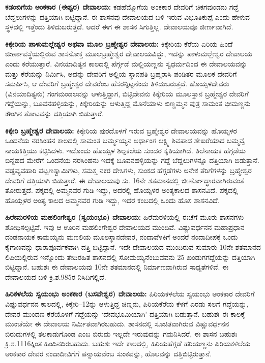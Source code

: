 \textbf{ಕಡಂಬಿಗೆಯ ಅಂಕಕಾರ (ಈಶ್ವರ) ದೇವಾಲಯ:} ಕಡಹೆಮ್ಮೊಗೆಯ ಅಂಕಕಾರ ದೇವರಿಗೆ ಚಿಕಗವುಂಡನು ಗದ್ದೆ ಬೆದ್ದಲುಗಳನ್ನು ದತ್ತಿಯಾಗಿ ಬಿಟ್ಟಿದ್ದಾನೆ. ಈ ಶಾಸನವು ದೇವಾಲಯದ ಬಳಿ ಇರುವ ವಿಭೂತಿಕುಪ್ಪೆ ಎಂದು ಹೇಳುವ ಸ್ಥಳದಲ್ಲಿ ಇತ್ತೆಂದು ತಿಳಿದುಬರುತ್ತದೆ. ಆದರೆ ಈಗ ಈ ಶಾಸನ ಸಿಗುತ್ತಿಲ್ಲ. ದೇವಾಲಯವೂ ಜೀರ್ಣವಾಗಿದೆ.

\textbf{ಕಿಕ್ಕೇರಿಯ ಪಾಳುಮಲ್ಲೇಶ್ವರ ಅಥವಾ ಮೂಲ ಬ್ರಹ್ಮೇಶ್ವರ ದೇವಾಲಯ:} ಕಿಕ್ಕೇರಿಯ ಕೆರೆಯ ಏರಿಯ ಹಿಂದೆ ಜೀರ್ಣಾವಸ್ಥೆಯಲ್ಲಿರುವ ಶಾಸನೋಕ್ತ ಮೂಲಬ್ರಹ್ಮೇಶ್ವರ ದೇವಾಲಯವಿದ್ದು, ಇದನ್ನು ಪಾಳುಮಲ್ಲೇಶ್ವರ ದೇವಾಲಯ ಎಂದು ಕರೆಯುತ್ತಾರೆ. ವಿನಯಾದಿತ್ಯನ ಕಾಲದಲ್ಲಿ ಪೆರ್ಗ್ಗಡೆ ಮಲ್ಲಿಯಣ್ಣನು ಸ್ವಧರ್ಮದಿಂದ ಈ ದೇವಾಲಯವನ್ನು ಮತ್ತು ಕೆರೆಯನ್ನು ನಿರ್ಮಿಸಿ, ಅದನ್ನು ದೇವರಿಗೆ ಅಲ್ಲಿಯ ಸ್ಥಾನಪತಿ ಬ್ರಹ್ಮರಾಸಿ ಪಂಡಿತರ ಮೂಲಕ ದೇವರಿಗೆ ಸಮರ್ಪಿಸಿ, ಆ ದೇವರಿಗೆ ಬ್ರಹ್ಮೇಶ್ವರ ದೇವರೆಂಬ ಹೆಸರನ್ನಿಟ್ಟನೆಂದು ತಿಳಿದುಬರುತ್ತದೆ. ಹೊಯ್ಸಳದೇವರು (ವಿನಯಾದಿತ್ಯನು) ಗಂಗಮಂಡಲವನ್ನು ಆಳುತ್ತಿದ್ದಾಗ, ಬಿಟ್ಟಿದೇವನು ಕಿಕ್ಕೇರಿಯ ಮೂಲಸ್ಥಾನ ಬ್ರಹ್ಮೇಶ್ವರ ದೇವರಿಗೆ ಗದ್ದೆಯನ್ನು, ಬೂವನಹಳ್ಳಿಯನ್ನು, ಕಿಕ್ಕೇರಿಯನ್ನು ಆಳುತ್ತಿದ್ದ ಮೊನೆಯಾಳು ಬಿಣ್ಣಮ್ಮನ ಪುತ್ರ ಸಾಮಂತ ಭೀಮಣ್ಣನು ಕೌಂಗಿನ ತೋಟವನ್ನು ದತ್ತಿಯಾಗಿ ಬಿಡುತ್ತಾರೆ.

\textbf{ಕಿಕ್ಕೇರಿ ಬ್ರಹ್ಮೇಶ್ವರ ದೇವಾಲಯ:} ಕಿಕ್ಕೇರಿಯ ಪುರದೊಳಗೆ ಇರುವ ಬ್ರಹ್ಮೇಶ್ವರ ದೇವಾಲಯವನ್ನು ಹೊಯ್ಸಳರ ಒಂದನೆಯ ನರಸಿಂಹನ ಕಾಲದಲ್ಲಿ ಸಾಮಂತ ಬರ್ಮ್ಮಯ್ಯನ ಅರ್ಧಾಂಗ ಲಕ್ಷ್ಮಿ ಶಿವಪಾದ ಶೇಖರೆಯಾದ ಬಮ್ಮವ್ವೆ ನಾಯಕಿತ್ತಿಯು ಕಟ್ಟಿಸಿದಳು. ಇದೊಂದು ಹೊಯ್ಸಳ ಶಿಲ್ಪಕಲೆಯ ಸುಂದರ ಕೃತಿಯಾಗಿದೆ. ತಿಲೆನಾಯಕ ಹೆಗ್ಗಡೆಯ ಬಿನ್ನಹದ ಮೇರೆಗೆ ಒಂದನೆಯ ನರಸಿಂಹನು ಇದಕ್ಕೆ ಬೂವನಹಳ್ಳಿಯನ್ನು ಗದ್ದೆ ಬೆದ್ದಲುಗಳನ್ನೂ ದತ್ತಿಯಾಗಿ ಬಿಡುತ್ತಾನೆ. ವಡ್ಡವ್ಯವಹಾರಿ ಪಟ್ಟಣಸ್ವಾಮಿಗಳು, ಸಮಸ್ತ ನಕರ ದೇಸಿಗಳು, ಸುಂಕದ ಹೆಗ್ಗಡೆಗಳು ಅನೇಕ ತೆರಿಗೆಗಳನ್ನು ಬ್ರಹ್ಮೇಶ್ವರ ದೇವರಿಗೆ ದತ್ತಿಯಾಗಿ ಬಿಡುತ್ತಾರೆ. ಈ ದೇವಾಲಯವು ಸು. 16ನೇ ಶತಮಾನದಲ್ಲಿ ಜೀರ್ಣೋದ್ಧಾರವಾಗಿರುವಂತೆ ತೋರುತ್ತದೆ. ಪಕ್ಕದಲ್ಲಿ ಅಮ್ಮನವರ ಗುಡಿ ಇದ್ದು, ಅದರಲ್ಲಿ ಹೊಯ್ಸಳರ ಅಂತ್ಯಕಾಲದ ಶಾಸನವಿದೆ. ಪಕ್ಕದಲ್ಲಿ ಹೊಯ್ಸಳರ ಅಂತ್ಯ ಕಾಲದ ಅಮ್ಮನವರ ಗುಡಿ ಇದ್ದು, ಇದರ ಕಂಬದಲ್ಲಿ ಒಂದು ಹೊಸ ಶಾಸನವಿದೆ.

\textbf{ಹಿರೇಮರಳಿಯ ಮಹಲಿಂಗೇಶ್ವರ (ಸ್ವಯಂಭೂ) ದೇವಾಲಯ:} ಹಿರೆಮರಳಿಯಲ್ಲಿ ಈಚೆಗೆ ಮೂರು ಶಾಸನಗಳು ಶೋಧಿಸಲ್ಪಟ್ಟಿವೆ. ಇವು ಆ ಊರಿನ ಮಹಲಿಂಗೇಶ್ವರ ದೇವಾಲಯದ ಮುಂದಿವೆ. ವಿಷ್ಣುವರ್ಧನನ ಮಹಾಪ್ರಧಾನ ದಂಡನಾಯಕ ಕಾಮಯ್ಯನು ಮಣಲಿಯ ಮೂಲಸ್ಥಾನದೇವರ, ನಂದಾವೆಳಕಿಗೆ ಅಂದರೆ ನಂದಾದೀಪಕ್ಕೆ ಒಂದು ಕೈಗಾಣವನ್ನು ಧಾರಾಪೂರ್ವಕವಾಗಿ ದತ್ತಿ ಬಿಟ್ಟಿದ್ದಾನೆ. ಇದೇ ದೇವಾಲಯದ ಮುಂದಿರುವ ಸುಮಾರು 10ನೇ ಶತಮಾನದ ಲಿಪಿಯಲ್ಲಿರುವ ಇನ್ನೊಂದು ತೇದಿರಹಿತ ಶಾಸನದಲ್ಲಿ ಸೋಮಯ್ಯನೆಂಬುವವನು 25 ಖಂಡುಗಗದ್ದೆಯನ್ನು ದತ್ತಿಯಾಗಿ ಬಿಟ್ಟಿದ್ದಾನೆ. ಬಹುಶಃ ಈ ದೇವಾಲಯವು 10ನೇ ಶತಮಾನದಲ್ಲಿ ನಿರ್ಮಾಣವಾಗಿರುವ ಸಾಧ್ಯತೆಗಳಿವೆ. ಈ ದೇವಾಲಯದ ಬಳಿ ಕ್ರಿ.ಶ.985ರ ನಿಸಿದಿಗಲ್ಲಿದೆ.

\textbf{ಹಿರಿಕಳಲೆಯ ಸ್ವಯಂಭು ಅಂಕಕಾರ (ಬಸವೇಶ್ವರ) ದೇವಾಲಯ:} ಪಿರಿಯಕಳಲೆಯ ಸ್ವಯಂಭು ಅಂಕಕಾರ ದೇವರಿಗೆ ವಿಷ್ಣುವರ್ಧನನ ಕಾಲದಲ್ಲಿ, ಕಿಕ್ಕೇರಿ–12ನ್ನು ಆಳುತ್ತಿದ್ದ ಚಿಣ್ನನು, ಪಿರಿಯಕೆರೆಯ ಕೆಳಗೆ ಎರಡು ಸಲಗೆ ಗದ್ದೆಯನ್ನು, ದೇವರ ಮುಂದಣ ಕೆರೆಯೊಳಗೆ ಗದ್ದೆಯನ್ನು ‘ದೇವಭೂಮಿಯಾಗಿ’ ದತ್ತಿಯಾಗಿ ಬಿಡುತ್ತಾನೆ. ಬಹುಶಃ ಈ ಕಾಲಕ್ಕೆ ಮುಂಚೆಯೇ ಈ ದೇವಾಲಯ ನಿರ್ಮಿತವಾಗಿರಬಹುದು. ಶಾಸನದಲ್ಲಿ ಸೂಚಿತವಾಗಿರುವ ವಿಷ್ಣುವರ್ಧನನ ಬಿರುದುಗಳಲ್ಲಿ ತಲಕಾಡುಗೊಂಡ ಎಂಬ ಬಿರುದು ಇಲ್ಲದೇ ಇರುವುದನ್ನು ಗಮನಿಸಿದರೆ, ಈ ಶಾಸನ ಬಹುಶಃ ಕ್ರಿ.ಶ.1116ಕ್ಕಿಂತ ಹಿಂದಿನದಿರಬಹುದು. ಬಹುಶಃ ಇದೇ ಕಾಲದಲ್ಲಿ, ಹಿರಿಯಹೆಗ್ಗಡೆ ಹರಿಯಣ್ಣನು ಪಿರಿಯಕಳಿಲೆಯ ಅಂಕಕಾರ ದೇವರ ನಂದಾದೀವಿಗೆಗೆ ಪನ್ನಾಯವೆಂಬ ಸುಂಕವನ್ನು, ಹೊಲವನ್ನು ದತ್ತಿಬಿಟ್ಟಿರುತ್ತಾನೆ.

